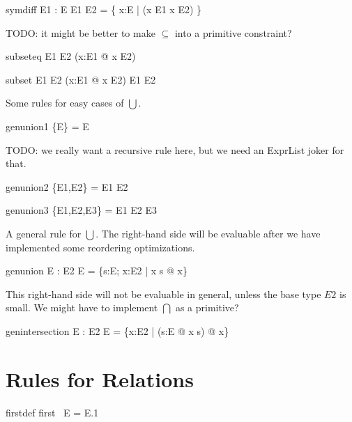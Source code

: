 \documentclass{article}
\begin{document}
\begin{zedrule}{symdiff}
  \proviso E1 : \power E
\derives
   E1 \symdiff E2 = \{ x:E | \lnot (x \in E1 \iff x \in E2) \}
\end{zedrule}

TODO: it might be better to make $\subseteq$ into a primitive constraint?
\begin{zedrule}{subseteq}
   E1 \subseteq E2 \iff (\forall x:E1 @ x \in E2)
\end{zedrule}

\begin{zedrule}{subset}
   E1 \subset E2 \iff (\forall x:E1 @ x \in E2) \land E1 \neq E2
\end{zedrule}

Some rules for easy cases of $\bigcup$.
\begin{zedrule}{genunion1}
   \bigcup \{E\} = E
\end{zedrule}

TODO: we really want a recursive rule here,
but we need an ExprList joker for that.
\begin{zedrule}{genunion2}
   \bigcup \{E1,E2\} = E1 \cup E2
\end{zedrule}
\begin{zedrule}{genunion3}
   \bigcup \{E1,E2,E3\} = E1 \cup E2 \cup E3
\end{zedrule}

A general rule for $\bigcup$.
The right-hand side will be evaluable after we have implemented
some reordering optimizations. 
\begin{zedrule}{genunion}
   \proviso E : \power \power E2
\derives
   \bigcup E = \{s:E; x:E2 | x \in s @ x\}
\end{zedrule}

This right-hand side will not be evaluable in general,
unless the base type $E2$ is small.  We might have to
implement $\bigcap$ as a primitive?
\begin{zedrule}{genintersection}
   \proviso E : \power \power E2
\derives
   \bigcap E = \{x:E2 | (\forall s:E @ x \in s) @ x\}
\end{zedrule}


\section{Rules for Relations}

\begin{zedrule}{firstdef}
   first~ E = E.1
\end{zedrule}
\end{document}
